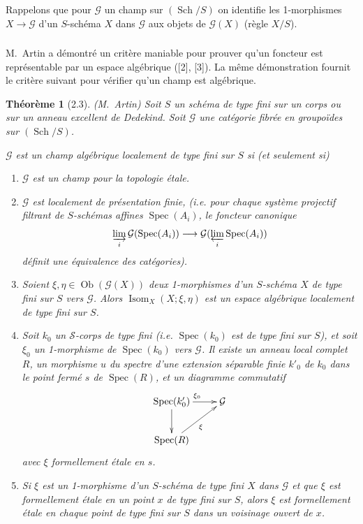 \documentclass[11pt,a4paper]{amsart}
\theoremstyle{plain}
\newtheorem{theorem}{Th\'eor\`eme}[section]
\theoremstyle{definition}
\DeclareMathOperator{\Isom}{Isom}
\DeclareMathOperator{\Spec}{Spec}
\DeclareMathOperator{\Sch}{Sch}
\newcommand{\CG}{\mathcal{G}}
\newcommand{\CS}{\mathcal{S}}
\DeclareMathOperator{\Ob}{Ob}
\begin{document}
\medskip

Rappelons que pour $\CG$ un champ sur $(\Sch/S)$ on identifie les 1-morphismes $X \to \CG$ d'un $S$-sch\'ema $X$ dans $\CG$ aux objets de $\CG(X)$ (r\`egle $X/S$).

\subsubsection{}
M.~Artin a d\'emontr\'e un crit\`ere maniable pour prouver qu'un foncteur est repr\'esentable par un espace alg\'ebrique ([2], [3]). La m\^eme d\'emonstration fournit le crit\`ere suivant pour v\'erifier qu'un champ est alg\'ebrique.

\begin{theorem}[2.3] (M.~Artin)
Soit $S$ un sch\'ema de type fini sur un corps ou sur un anneau excellent de Dedekind. Soit $\CG$ une cat\'egorie fibr\'ee en groupo\"ides sur $(\Sch/S)$.

$\CG$ est un champ alg\'ebrique localement de type fini sur $S$ si (et seulement si)
\begin{enumerate}[label=(\arabic*)]
\item[(0)] $\CG$ est un champ pour la topologie \'etale.

\item[(1)] $\CG$ est localement de pr\'esentation finie, (i.e. pour chaque syst\`eme projectif filtrant de $S$-sch\'emas affines $\Spec(A_i)$, le foncteur canonique
\[
\varinjlim_i \CG(\Spec(A_i)) \longrightarrow \CG(\varprojlim_i \Spec(A_i))
\]
d\'efinit une \'equivalence des cat\'egories).

\item[(2)] Soient $\xi, \eta \in \Ob(\CG(X))$ deux 1-morphismes d'un $S$-sch\'ema $X$ de type fini sur $S$ vers $\CG$. Alors $\Isom_X(X; \xi, \eta)$ est un espace alg\'ebrique localement de type fini sur $S$.

\item[(3)] Soit $k_0$ un $\CS$-corps de type fini (i.e. $\Spec(k_0)$ est de type fini sur $S$), et soit $\xi_0$ un 1-morphisme de $\Spec(k_0)$ vers $\CG$. Il existe un anneau local complet $R$, un morphisme $u$ du spectre d'une extension s\'eparable finie $k'_0$ de $k_0$ dans le point ferm\'e $s$ de $\Spec(R)$, et un diagramme commutatif
\[
\xymatrix{
\Spec(k'_0) \ar[r]^{\xi_0} \ar[d] & \CG \\
\Spec(R) \ar[ru]_{\xi}
}
\]
avec $\xi$ formellement \'etale en $s$.

\item[(4)] Si $\xi$ est un 1-morphisme d'un $S$-sch\'ema de type fini $X$ dans $\CG$ et que $\xi$ est formellement \'etale en un point $x$ de type fini sur $S$, alors $\xi$ est formellement \'etale en chaque point de type fini sur $S$ dans un voisinage ouvert de $x$.
\end{enumerate}
\end{theorem}
\end{document}
